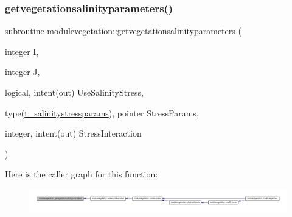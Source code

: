 \subsubsection{\texorpdfstring{getvegetationsalinityparameters()}{getvegetationsalinityparameters()}}
{\footnotesize\ttfamily subroutine modulevegetation\+::getvegetationsalinityparameters (\begin{DoxyParamCaption}\item[{integer}]{I,  }\item[{integer}]{J,  }\item[{logical, intent(out)}]{Use\+Salinity\+Stress,  }\item[{type(\mbox{\hyperlink{structmodulevegetation_1_1t__salinitystressparams}{t\+\_\+salinitystressparams}}), pointer}]{Stress\+Params,  }\item[{integer, intent(out)}]{Stress\+Interaction }\end{DoxyParamCaption})\hspace{0.3cm}{\ttfamily [private]}}

Here is the caller graph for this function\+:\nopagebreak
\begin{figure}[H]
\begin{center}
\leavevmode
\includegraphics[width=350pt]{namespacemodulevegetation_aede0fbef50c854f21b7dc76d3534b847_icgraph}
\end{center}
\end{figure}
\mbox{\label{namespacemodulevegetation_a5ab5e21fef383950e0f159dd2ad953aa}} 
